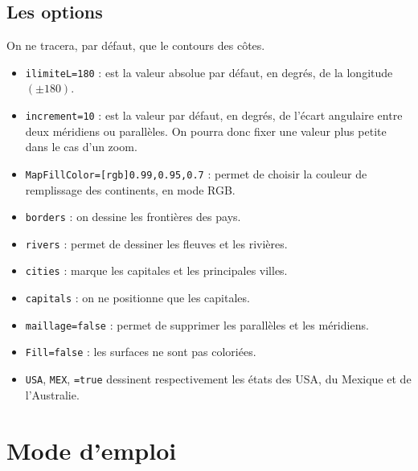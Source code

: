 \documentclass[11pt,french,BCOR10mm,DIV12,bibliography=totoc,parskip=false,
   smallheadings, headexclude,footexclude,oneside]{pst-doc}
\let\Parameter\texttt
\begin{document}
\subsection{Les options}
On ne tracera, par défaut, que le contours des côtes.
\begin{itemize}
\item \Parameter{ilimiteL=180} : est la valeur absolue par défaut, en degrés, de
la longitude $(\pm 180)$.
\item \Parameter{increment=10} : est la valeur par défaut, en degrés, de l'écart angulaire entre deux
méridiens ou parallèles. On pourra donc fixer une valeur plus petite dans le cas
d'un zoom.
\item  \Parameter{MapFillColor={[rgb]{0.99,0.95,0.7}}} : permet de choisir la couleur de remplissage des continents,
 en mode RGB.
\item  \Parameter{borders} : on dessine les frontières des pays.
\item \Parameter{rivers} : permet de dessiner les fleuves et les rivières.
\item \Parameter{cities} : marque les capitales et les principales villes.
\item \Parameter{capitals} : on ne positionne que les capitales.
\item \Parameter{maillage=false} : permet de supprimer les parallèles et les
méridiens.
\item \Parameter{Fill=false} : les surfaces ne sont pas coloriées.
\item \Parameter{USA}, \Parameter{MEX},
\Parameter{=true} dessinent respectivement les états des
\textsc{USA}, du Mexique et de l'Australie.
\end{itemize}

\clearpage

\section{Mode d'emploi}
\end{document}
